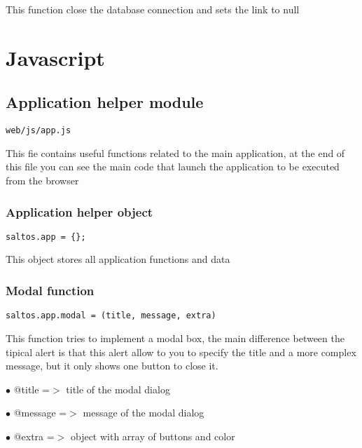 \documentclass[a4paper]{book}
\begin{document}
This function close the database connection and sets the link to null


\hypertarget{toc391}{}
\chapter{Javascript}

\hypertarget{toc392}{}
\section{Application helper module}

\begin{lstlisting}
web/js/app.js
\end{lstlisting}

This fie contains useful functions related to the main application, at the end of this file you
can see the main code that launch the application to be executed from the browser

\hypertarget{toc393}{}
\subsection{Application helper object}

\begin{lstlisting}
saltos.app = {};
\end{lstlisting}

This object stores all application functions and data

\hypertarget{toc394}{}
\subsection{Modal function}

\begin{lstlisting}
saltos.app.modal = (title, message, extra)
\end{lstlisting}

This function tries to implement a modal box, the main difference between the tipical alert
is that this alert allow to you to specify the title and a more complex message, but it only
shows one button to close it.

\begin{compactitem}
\item[\color{myblue}$\bullet$] @title   =$>$ title of the modal dialog
\item[\color{myblue}$\bullet$] @message =$>$ message of the modal dialog
\item[\color{myblue}$\bullet$] @extra   =$>$ object with array of buttons and color
\end{compactitem}
\end{document}
